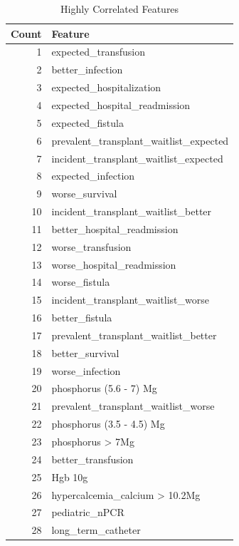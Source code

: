 \documentclass[
  letterpaper,
  DIV=11,
  numbers=noendperiod]{scrreprt}
\begin{document}
\begin{table}

\caption{Highly Correlated Features}
\centering
\begin{tabular}[t]{r|l}
\hline
Count & Feature\\
\hline
1 & expected\_transfusion\\
\hline
2 & better\_infection\\
\hline
3 & expected\_hospitalization\\
\hline
4 & expected\_hospital\_readmission\\
\hline
5 & expected\_fistula\\
\hline
6 & prevalent\_transplant\_waitlist\_expected\\
\hline
7 & incident\_transplant\_waitlist\_expected\\
\hline
8 & expected\_infection\\
\hline
9 & worse\_survival\\
\hline
10 & incident\_transplant\_waitlist\_better\\
\hline
11 & better\_hospital\_readmission\\
\hline
12 & worse\_transfusion\\
\hline
13 & worse\_hospital\_readmission\\
\hline
14 & worse\_fistula\\
\hline
15 & incident\_transplant\_waitlist\_worse\\
\hline
16 & better\_fistula\\
\hline
17 & prevalent\_transplant\_waitlist\_better\\
\hline
18 & better\_survival\\
\hline
19 & worse\_infection\\
\hline
20 & phosphorus (5.6 - 7) Mg\\
\hline
21 & prevalent\_transplant\_waitlist\_worse\\
\hline
22 & phosphorus (3.5 - 4.5) Mg\\
\hline
23 & phosphorus > 7Mg\\
\hline
24 & better\_transfusion\\
\hline
25 & Hgb 10g\\
\hline
26 & hypercalcemia\_calcium > 10.2Mg\\
\hline
27 & pediatric\_nPCR\\
\hline
28 & long\_term\_catheter\\
\hline
\end{tabular}
\end{table}
\end{document}
